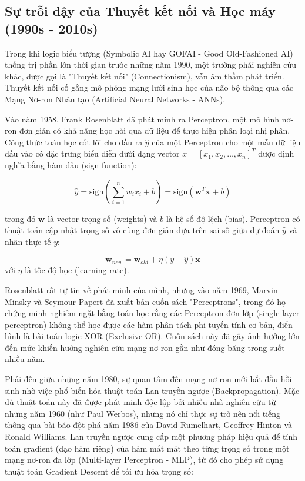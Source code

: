 \documentclass[12pt,a4paper]{article}
\begin{document}
\newpage

\subsection{Sự trỗi dậy của Thuyết kết nối và Học máy (1990s - 2010s)}

Trong khi logic biểu tượng (Symbolic AI hay GOFAI - Good Old-Fashioned AI) thống trị phần lớn thời gian trước những năm 1990, một trường phái nghiên cứu khác, được gọi là "Thuyết kết nối" (Connectionism), vẫn âm thầm phát triển. Thuyết kết nối cố gắng mô phỏng mạng lưới sinh học của não bộ thông qua các Mạng Nơ-ron Nhân tạo (Artificial Neural Networks - ANNs).

Vào năm 1958, Frank Rosenblatt đã phát minh ra Perceptron, một mô hình nơ-ron đơn giản có khả năng học hỏi qua dữ liệu để thực hiện phân loại nhị phân. Công thức toán học cốt lõi cho đầu ra $\hat{y}$ của một Perceptron cho một mẫu dữ liệu đầu vào có đặc trưng biểu diễn dưới dạng vector $x = [x_1, x_2, \dots, x_n]^T$ được định nghĩa bằng hàm dấu (sign function):

\begin{equation}
\hat{y} = \text{sign}\left(\sum_{i=1}^{n} w_i x_i + b\right) = \text{sign}(\mathbf{w}^T \mathbf{x} + b)
\end{equation}

trong đó $\mathbf{w}$ là vector trọng số (weights) và $b$ là hệ số độ lệch (bias). Perceptron có thuật toán cập nhật trọng số vô cùng đơn giản dựa trên sai số giữa dự đoán $\hat{y}$ và nhãn thực tế $y$:

\begin{equation}
\mathbf{w}_{new} = \mathbf{w}_{old} + \eta (y - \hat{y})\mathbf{x}
\end{equation}
với $\eta$ là tốc độ học (learning rate). 

Rosenblatt rất tự tin về phát minh của mình, nhưng vào năm 1969, Marvin Minsky và Seymour Papert đã xuất bản cuốn sách "Perceptrons", trong đó họ chứng minh nghiêm ngặt bằng toán học rằng các Perceptron đơn lớp (single-layer perceptron) không thể học được các hàm phân tách phi tuyến tính cơ bản, điển hình là bài toán logic XOR (Exclusive OR). Cuốn sách này đã gây ảnh hưởng lớn đến mức khiến hướng nghiên cứu mạng nơ-ron gần như đóng băng trong suốt nhiều năm.

Phải đến giữa những năm 1980, sự quan tâm đến mạng nơ-ron mới bắt đầu hồi sinh nhờ việc phổ biến hóa thuật toán Lan truyền ngược (Backpropagation). Mặc dù thuật toán này đã được phát minh độc lập bởi nhiều nhà nghiên cứu từ những năm 1960 (như Paul Werbos), nhưng nó chỉ thực sự trở nên nổi tiếng thông qua bài báo đột phá năm 1986 của David Rumelhart, Geoffrey Hinton và Ronald Williams. Lan truyền ngược cung cấp một phương pháp hiệu quả để tính toán gradient (đạo hàm riêng) của hàm mất mát theo từng trọng số trong một mạng nơ-ron đa lớp (Multi-layer Perceptron - MLP), từ đó cho phép sử dụng thuật toán Gradient Descent để tối ưu hóa trọng số:
\end{document}
